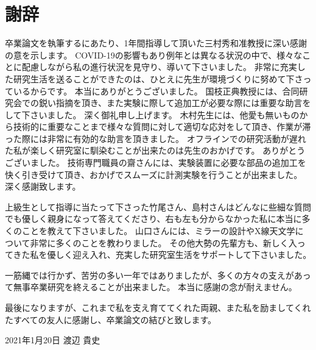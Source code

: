 \chapter*{謝辞}

卒業論文を執筆するにあたり、1年間指導して頂いた三村秀和准教授に深い感謝の意を示します。
COVID-19の影響もあり例年とは異なる状況の中で、様々なことに配慮しながら私の進行状況を見守り、導いて下さいました。
非常に充実した研究生活を送ることができたのは、ひとえに先生が環境づくりに努めて下さっているからです。
本当にありがとうございました。
国枝正典教授には、合同研究会での鋭い指摘を頂き、また実験に際して追加工が必要な際には重要な助言をして下さいました。
深く御礼申し上げます。
木村先生には、他愛も無いものから技術的に重要なことまで様々な質問に対して適切な応対をして頂き、作業が滞った際には非常に有効的な助言を頂きました。
オフラインでの研究活動が遅れた私が楽しく研究室に馴染むことが出来たのは先生のおかげです。
ありがとうございました。
技術専門職員の齋さんには、実験装置に必要な部品の追加工を快く引き受けて頂き、おかげでスムーズに計測実験を行うことが出来ました。
深く感謝致します。

上級生として指導に当たって下さった竹尾さん、島村さんはどんなに些細な質問でも優しく親身になって答えてくださり、右も左も分からなかった私に本当に多くのことを教えて下さいました。
山口さんには、ミラーの設計やX線天文学について非常に多くのことを教わりました。
その他大勢の先輩方も、新しく入ってきた私を優しく迎え入れ、充実した研究室生活をサポートして下さいました。

一筋縄では行かず、苦労の多い一年ではありましたが、多くの方々の支えがあって無事卒業研究を終えることが出来ました。
本当に感謝の念が耐えません。

最後になりますが、これまで私を支え育ててくれた両親、また私を励ましてくれたすべての友人に感謝し、卒業論文の結びと致します。

\label{thankyou}

\lhead[謝辞]{}
\thispagestyle{empty}

\newpage

\begin{flushright}
2021年1月20日 渡辺 貴史
\end{flushright}


